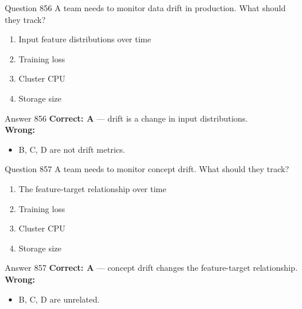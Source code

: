 \documentclass[aspectratio=169,11pt]{beamer}
\begin{document}
	\begin{frame}{Question 856}
		A team needs to monitor data drift in production. What should they track?
		\begin{enumerate}[label=\Alph*.]
			\item Input feature distributions over time
			\item Training loss
			\item Cluster CPU
			\item Storage size
		\end{enumerate}
	\end{frame}
	\begin{frame}{Answer 856}
		\textbf{Correct: A} --- drift is a change in input distributions.\\
		\vspace{0.5em}
		\textbf{Wrong:}
		\begin{itemize}
			\item B, C, D are not drift metrics.
		\end{itemize}
	\end{frame}
	
	\begin{frame}{Question 857}
		A team needs to monitor concept drift. What should they track?
		\begin{enumerate}[label=\Alph*.]
			\item The feature-target relationship over time
			\item Training loss
			\item Cluster CPU
			\item Storage size
		\end{enumerate}
	\end{frame}
	\begin{frame}{Answer 857}
		\textbf{Correct: A} --- concept drift changes the feature-target relationship.\\
		\vspace{0.5em}
		\textbf{Wrong:}
		\begin{itemize}
			\item B, C, D are unrelated.
		\end{itemize}
	\end{frame}
	
\end{document}
